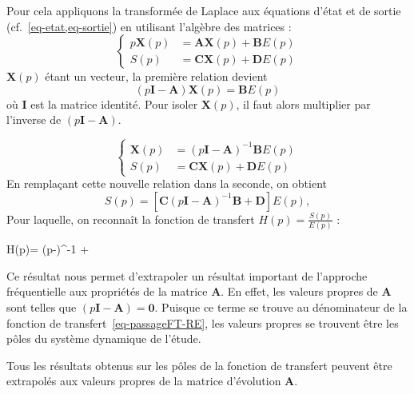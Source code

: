 Pour cela appliquons la transformée de Laplace aux équations d'état et de 
sortie (cf.~\cref{eq-etat,eq-sortie}) en utilisant l'algèbre des matrices :
\[
    \begin{cases}
        p\boldsymbol{X}(p)&=\boldsymbol{AX}(p)+\boldsymbol{B}E(p) \\
        S(p) &= \boldsymbol{CX}(p)+\boldsymbol{D}E(p)
    \end{cases}
\]
$\boldsymbol{X}(p)$ étant un vecteur, la première relation devient 
\[
    (p\boldsymbol{I}-\boldsymbol{A})\boldsymbol{X}(p)=\boldsymbol{B}E(p)
\]
où $\boldsymbol{I}$ est la matrice identité. Pour isoler $\boldsymbol{X}(p)$, 
il faut alors multiplier par l'inverse de $(p\boldsymbol{I}-\boldsymbol{A})$.

\[
\begin{cases}
\boldsymbol{X}(p)&=(p\boldsymbol{I}-\boldsymbol{A})^{-1}\boldsymbol{B}E(p) \\
 S(p)&=\boldsymbol{CX}(p)+\boldsymbol{D}E(p)
\end{cases}
\]
En remplaçant cette nouvelle relation dans la seconde, on obtient 
\[
    S(p)=\left[\boldsymbol{C}(p\boldsymbol{I}-\boldsymbol{A})^{-1}
         \boldsymbol{B}+\boldsymbol{D}\right]E(p),
\]
Pour laquelle, on reconnaît la fonction de transfert $H(p)=\frac{S(p)}{E(p)}$ :
\begin{bequation}
    H(p)=
          \left(p-\right)^{-1}
          +
          \label{eq-passageFT-RE}
\end{bequation}
Ce résultat nous permet d'extrapoler un résultat important de l'approche 
fréquentielle aux propriétés de la matrice $\boldsymbol{A}$. En effet, les
valeurs propres de $\boldsymbol{A}$ sont telles que 
$\left(p\boldsymbol{I}-\boldsymbol{A}\right)=\boldsymbol{0}$. Puisque ce terme 
se trouve au dénominateur de la fonction de transfert~\cref{eq-passageFT-RE},
les valeurs propres se trouvent être les pôles du système dynamique de l'étude.

Tous les résultats obtenus sur les pôles de la fonction de transfert peuvent
être extrapolés aux valeurs propres de la matrice d'évolution $\boldsymbol{A}$.

\captionsetup{width=0.9\linewidth}
